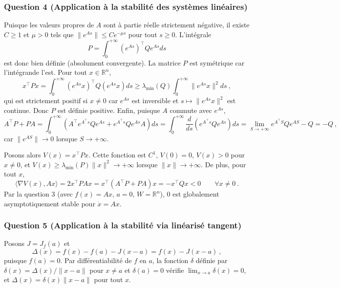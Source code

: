 \hypertarget{answer-lyap-4}{%
\subsubsection*{Question 4 (Application à la stabilité des systèmes
linéaires)}\label{answer-lyap-4}}


Puisque les valeurs propres de \(A\) sont à partie réelle strictement
négative, il existe \(C\geq 1\) et \(\mu>0\) tels que
\(\|e^{As}\|\leq C e^{-\mu s}\) pour tout \(s\geq 0\). L'intégrale \[
P=\int_0^{+\infty}\left(e^{As}\right)^\top Q e^{As}ds
\] est donc bien définie (absolument convergente). La matrice \(P\) est
symétrique car l'intégrande l'est. Pour tout \(x\in\mathbb{R}^n\), \[
x^\top P x = \int_0^{+\infty}\left(e^{As}x\right)^\top Q \left(e^{As}x\right)ds
\geq \lambda_{\min}(Q)\int_0^{+\infty}\|e^{As}x\|^2 ds \ ,
\] qui est strictement positif si \(x\neq 0\) car \(e^{As}\) est
inversible et \(s\mapsto \|e^{As}x\|^2\) est continue. Donc \(P\) est
définie positive. Enfin, puisque \(A\) commute avec \(e^{As}\), \[
A^\top P + PA = \int_0^{+\infty}\left( A^\top e^{A^\top s} Q e^{As} + e^{A^\top s} Q e^{As} A \right) ds
= \int_0^{+\infty}\frac{d}{ds}\left( e^{A^\top s} Q e^{As} \right) ds
= \lim_{S\to+\infty} e^{A^\top S} Q e^{AS} - Q = -Q \ ,
\] car \(\|e^{AS}\|\to 0\) lorsque \(S\to +\infty\).

Posons alors \(V(x)=x^\top P x\). Cette fonction est \(C^1\), \(V(0)=0\),
\(V(x)>0\) pour \(x\neq 0\), et
\(V(x)\geq \lambda_{\min}(P)\|x\|^2\to+\infty\) lorsque
\(\|x\|\to+\infty\). De plus, pour tout \(x\), \[
\langle \nabla V(x), Ax\rangle = 2x^\top P A x = x^\top\left(A^\top P + PA\right)x = -x^\top Q x < 0 \qquad \forall x\neq 0 \ .
\] Par la question 3 (avec \(f(x)=Ax\), \(a=0\), \(W=\mathbb{R}^n\)), \(0\)
est globalement asymptotiquement stable pour \(\dot{x}=Ax\).

\hypertarget{answer-lyap-5}{%
\subsubsection*{Question 5 (Application à la stabilité via linéarisé
tangent)}\label{answer-lyap-5}}


Posons \(J=J_f(a)\) et \[
\Delta(x) = f(x)-f(a) - J(x-a) = f(x)- J(x-a)\ ,
\] puisque \(f(a)=0\). Par différentiabilité de \(f\) en \(a\), la
fonction \(\delta\) définie par \(\delta(x)=\Delta(x)/\|x-a\|\) pour
\(x\neq a\) et \(\delta(a)=0\) vérifie \(\lim_{x\to a}\delta(x)=0\), et
\(\Delta(x)=\delta(x)\|x-a\|\) pour tout \(x\).

